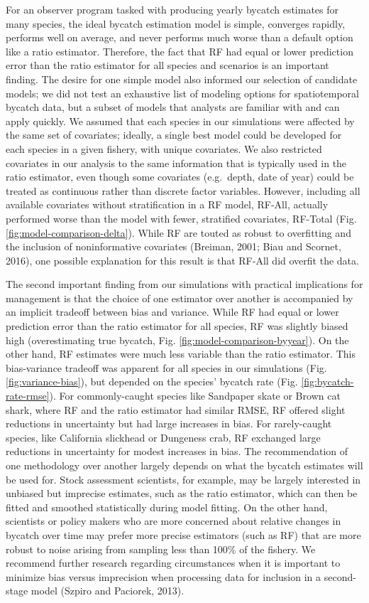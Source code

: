 \documentclass[]{article}
\begin{document}
For an observer program tasked with producing yearly bycatch estimates
for many species, the ideal bycatch estimation model is simple,
converges rapidly, performs well on average, and never performs much
worse than a default option like a ratio estimator. Therefore, the fact
that RF had equal or lower prediction error than the ratio estimator for
all species and scenarios is an important finding. The desire for one
simple model also informed our selection of candidate models; we did not
test an exhaustive list of modeling options for spatiotemporal bycatch
data, but a subset of models that analysts are familiar with and can
apply quickly. We assumed that each species in our simulations were
affected by the same set of covariates; ideally, a single best model
could be developed for each species in a given fishery, with unique
covariates. We also restricted covariates in our analysis to the same
information that is typically used in the ratio estimator, even though
some covariates (e.g.~depth, date of year) could be treated as
continuous rather than discrete factor variables. However, including all
available covariates without stratification in a RF model, RF-All,
actually performed worse than the model with fewer, stratified
covariates, RF-Total (Fig. \ref{fig:model-comparison-delta}). While RF
are touted as robust to overfitting and the inclusion of noninformative
covariates (Breiman, 2001; Biau and Scornet, 2016), one possible
explanation for this result is that RF-All did overfit the data.

The second important finding from our simulations with practical
implications for management is that the choice of one estimator over
another is accompanied by an implicit tradeoff between bias and
variance. While RF had equal or lower prediction error than the ratio
estimator for all species, RF was slightly biased high (overestimating
true bycatch, Fig. \ref{fig:model-comparison-byyear}). On the other
hand, RF estimates were much less variable than the ratio estimator.
This bias-variance tradeoff was apparent for all species in our
simulations (Fig. \ref{fig:variance-bias}), but depended on the species'
bycatch rate (Fig. \ref{fig:bycatch-rate-rmse}). For commonly-caught
species like Sandpaper skate or Brown cat shark, where RF and the ratio
estimator had similar RMSE, RF offered slight reductions in uncertainty
but had large increases in bias. For rarely-caught species, like
California slickhead or Dungeness crab, RF exchanged large reductions in
uncertainty for modest increases in bias. The recommendation of one
methodology over another largely depends on what the bycatch estimates
will be used for. Stock assessment scientists, for example, may be
largely interested in unbiased but imprecise estimates, such as the
ratio estimator, which can then be fitted and smoothed statistically
during model fitting. On the other hand, scientists or policy makers who
are more concerned about relative changes in bycatch over time may
prefer more precise estimators (such as RF) that are more robust to
noise arising from sampling less than 100\% of the fishery. We recommend
further research regarding circumstances when it is important to
minimize bias versus imprecision when processing data for inclusion in a
second-stage model (Szpiro and Paciorek, 2013).
\end{document}
